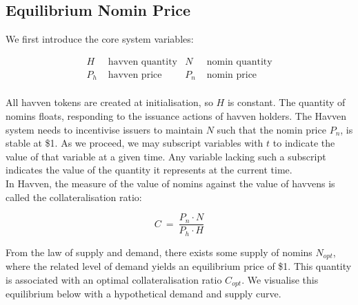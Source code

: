 \newpage

\subsection{Equilibrium Nomin Price}

\noindent We first introduce the core system variables:

\begin{align*}
H &\text{\ \ havven quantity} & N &\text{\ \ nomin quantity} \\
P_h &\text{\ \ havven price}  & P_n &\text{\ \ nomin price} \\
\end{align*}


\noindent All havven tokens are created at initialisation, so $H$ is constant.
The quantity of nomins floats, responding to the issuance actions of havven holders.
The Havven system needs to incentivise issuers to maintain $N$ such that
the nomin price $P_n$, is stable at \$1.
As we proceed, we may subscript variables with $t$ to indicate the value of that variable at a
given time. Any variable lacking such a subscript indicates the value of the quantity
it represents at the current time. \\

\noindent In Havven, the measure of the value of nomins against the value
of havvens is called the collateralisation ratio:

\begin{equation}
C \ = \ \frac{P_n \cdot N}{P_h \cdot H} \label{eq:collateralisation}
\end{equation}

\vspace{3 mm}

\noindent From the law of supply and demand, there exists some supply
of nomins $N_{opt}$, where the related level of demand yields an equilibrium
price of \$1. This quantity is associated with an optimal collateralisation ratio
$C_{opt}$. We visualise this equilibrium below with a hypothetical demand and supply curve.  \\

\begin{center}
\end{center}

